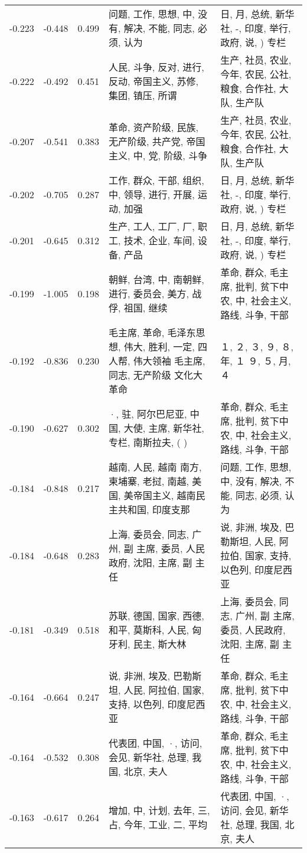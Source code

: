 \begin{tabular}{cccp{5cm}p{5cm}}
-0.223 & -0.448 & 0.499 & 问题, 工作, 思想, 中, 没有, 解决, 不能, 同志, 必须, 认为 & 日, 月, 总统, 新华社, -, 印度, 举行, 政府, 说, ) 专栏 \\
-0.222 & -0.492 & 0.451 & 人民, 斗争, 反对, 进行, 反动, 帝国主义, 苏修, 集团, 镇压, 所谓 & 生产, 社员, 农业, 今年, 农民, 公社, 粮食, 合作社, 大队, 生产队 \\
-0.207 & -0.541 & 0.383 & 革命, 资产阶级, 民族, 无产阶级, 共产党, 帝国主义, 中, 党, 阶级, 斗争 & 生产, 社员, 农业, 今年, 农民, 公社, 粮食, 合作社, 大队, 生产队 \\
-0.202 & -0.705 & 0.287 & 工作, 群众, 干部, 组织, 中, 领导, 进行, 开展, 运动, 加强 & 日, 月, 总统, 新华社, -, 印度, 举行, 政府, 说, ) 专栏 \\
-0.201 & -0.645 & 0.312 & 生产, 工人, 工厂, 厂, 职工, 技术, 企业, 车间, 设备, 产品 & 日, 月, 总统, 新华社, -, 印度, 举行, 政府, 说, ) 专栏 \\
-0.199 & -1.005 & 0.198 & 朝鲜, 台湾, 中, 南朝鲜, 进行, 委员会, 美方, 战俘, 祖国, 继续 & 革命, 群众, 毛主席, 批判, 贫下中农, 中, 社会主义, 路线, 斗争, 干部 \\
-0.192 & -0.836 & 0.230 & 毛主席, 革命, 毛泽东思想, 伟大, 胜利, 一定, 四人帮, 伟大领袖 毛主席, 同志, 无产阶级 文化大革命 & １, ２, ３, ９, ８, 年, １ ９, ５, 月, ４ \\
-0.190 & -0.627 & 0.302 & ·, 驻, 阿尔巴尼亚, 中国, 大使, 主席, 新华社, 专栏, 南斯拉夫, ( ) & 革命, 群众, 毛主席, 批判, 贫下中农, 中, 社会主义, 路线, 斗争, 干部 \\
-0.184 & -0.848 & 0.217 & 越南, 人民, 越南 南方, 柬埔寨, 老挝, 南越, 美国, 美帝国主义, 越南民主共和国, 印度支那 & 问题, 工作, 思想, 中, 没有, 解决, 不能, 同志, 必须, 认为 \\
-0.184 & -0.648 & 0.283 & 上海, 委员会, 同志, 广州, 副 主席, 委员, 人民政府, 沈阳, 主席, 副 主任 & 说, 非洲, 埃及, 巴勒斯坦, 人民, 阿拉伯, 国家, 支持, 以色列, 印度尼西亚 \\
-0.181 & -0.349 & 0.518 & 苏联, 德国, 国家, 西德, 和平, 莫斯科, 人民, 匈牙利, 民主, 斯大林 & 上海, 委员会, 同志, 广州, 副 主席, 委员, 人民政府, 沈阳, 主席, 副 主任 \\
-0.164 & -0.664 & 0.247 & 说, 非洲, 埃及, 巴勒斯坦, 人民, 阿拉伯, 国家, 支持, 以色列, 印度尼西亚 & 革命, 群众, 毛主席, 批判, 贫下中农, 中, 社会主义, 路线, 斗争, 干部 \\
-0.164 & -0.532 & 0.308 & 代表团, 中国, ·, 访问, 会见, 新华社, 总理, 我国, 北京, 夫人 & 革命, 群众, 毛主席, 批判, 贫下中农, 中, 社会主义, 路线, 斗争, 干部 \\
-0.163 & -0.617 & 0.264 & 增加, 中, 计划, 去年, 三, 占, 今年, 工业, 二, 平均 & 代表团, 中国, ·, 访问, 会见, 新华社, 总理, 我国, 北京, 夫人 \\

\end{tabular}
